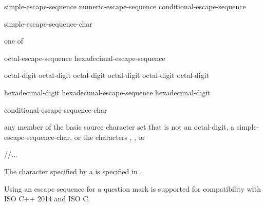 \documentclass{wg21}
\begin{document}
\begin{bnf}
    \br
    simple-escape-sequence\br
    numeric-escape-sequence\br
    conditional-escape-sequence
\end{bnf}

\begin{bnf}
    \br
    \terminal{\textbackslash} simple-escape-sequence-char
\end{bnf}

\begin{bnf}
     \textnormal{one of}\br
\end{bnf}

\begin{bnf}
    \br
    octal-escape-sequence\br
    hexadecimal-escape-sequence
\end{bnf}

\begin{bnf}
    \br
    \terminal{\textbackslash} octal-digit\br
    \terminal{\textbackslash} octal-digit octal-digit\br
    \terminal{\textbackslash} octal-digit octal-digit octal-digit
\end{bnf}

\begin{bnf}
    \br
     hexadecimal-digit\br
    hexadecimal-escape-sequence hexadecimal-digit
\end{bnf}

\begin{bnf}
    \br
    \terminal{\textbackslash} conditional-escape-sequence-char
\end{bnf}

\begin{bnf}
    \br
    \textnormal{any member of the basic source character set that is not an} octal-digit\textnormal{, a} simple-escape-sequence-char\textnormal{, or the characters , , or }
\end{bnf}

//...

\pnum
{}%
%
%
The character specified by a 
is specified in .
\begin{note}
    Using an escape sequence for a question mark
    is supported for compatibility with ISO C++ 2014 and ISO C.
\end{note}
\end{document}
